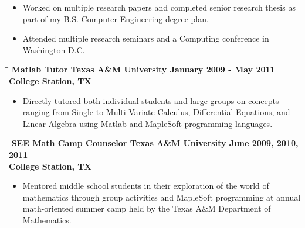 \documentclass[8pt]{res}
\begin{document}
\begin{resume}
\begin{itemize}
      \item Worked on multiple research papers and completed senior research thesis as part of my B.S. Computer Engineering degree plan.
      \item Attended multiple research seminars and a Computing conference in Washington D.C.
    \end{itemize}\vspace{-18pt}      %
    \pagebreak %
    \begin{tabbing}
      \hspace{2.3in}\= \hspace{2.6in}\= \kill %
      \bf Matlab Tutor \>\bf Texas A\&M University \>\bf January 2009 - May 2011\\ \>\bf College Station, TX
    \end{tabbing}\vspace{-10pt}      %
    \begin{itemize}
      \item Directly tutored both individual students and large groups on concepts ranging from Single to Multi-Variate Calculus, Differential Equations, and Linear Algebra using Matlab and MapleSoft programming languages.
    \end{itemize}\vspace{-18pt}      %
    \begin{tabbing}
      \hspace{2.3in}\= \hspace{2.6in}\= \kill %
      \bf SEE Math Camp Counselor \>\bf Texas A\&M University \>\bf June 2009, 2010, 2011\\ \>\bf College Station, TX
    \end{tabbing}\vspace{-10pt}      %
    \begin{itemize}
      \item Mentored middle school students in their exploration of the world of mathematics through group activities and MapleSoft programming at annual math-oriented summer camp held by the Texas A\&M Department of Mathematics.
    \end{itemize}


\end{resume}
\end{document}
